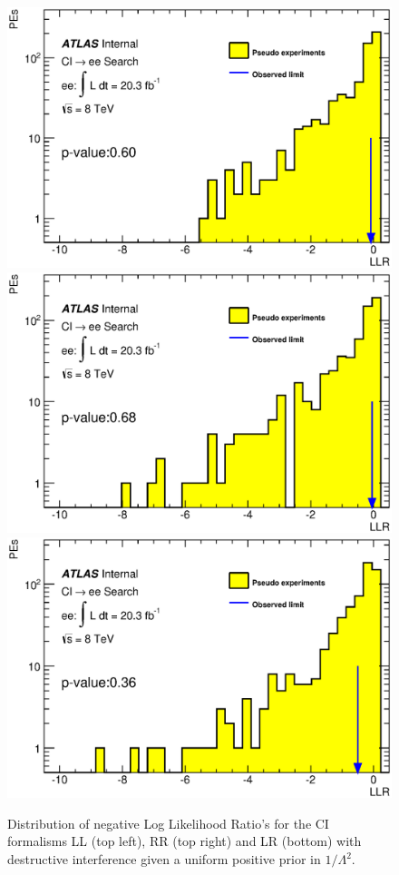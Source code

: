     \begin{figure}[h]
        \begin{center}
            \includegraphics[width=0.42\linewidth]{images/ee__LL_plus_L2/LLR.eps}
            \includegraphics[width=0.42\linewidth]{images/ee__RR_plus_L2/LLR.eps}
            \includegraphics[width=0.42\linewidth]{images/ee__LR_plus_L2/LLR.eps}
        \end{center}
       \caption{Distribution of negative Log Likelihood Ratio's for the CI formalisms LL (top left), RR (top right) and LR (bottom) with destructive interference given a uniform positive prior in $1/\Lambda^{2}$.}
       \label{fig:LLR_CI_des}
    \end{figure}



